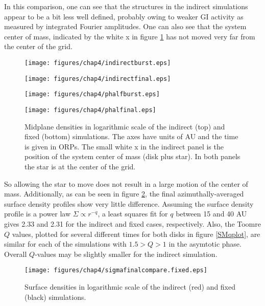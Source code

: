 In this comparison, one can see that the structures in the indirect simulations appear to be a bit less well defined, probably owing to weaker GI activity as measured by integrated Fourier amplitudes. One can also see that the system center of mass, indicated by the white x in figure \ref{SMfinalcomp} has not moved very far from the center of the grid. 
\begin{figure}[p]
\begin{minipage}{0.5\linewidth}
\centering
\texttt{[image: figures/chap4/indirectburst.eps]}
\end{minipage}
\hspace{0.25in}
\begin{minipage}{0.5\linewidth}
\centering
\texttt{[image: figures/chap4/indirectfinal.eps]}
\end{minipage}
\vspace{0.5in}


\begin{minipage}{0.5\linewidth}
\centering
\texttt{[image: figures/chap4/phalfburst.eps]}
\end{minipage}
\hspace{0.25in}
\begin{minipage}{0.5\linewidth}
\centering
\texttt{[image: figures/chap4/phalfinal.eps]}
\end{minipage}
\caption[Comparison of indirect and fixed run final midplane densities]{Midplane densities in logarithmic scale of the indirect (top) and fixed (bottom) simulations. The axes have units of AU and the time is given in ORPs. The small white x in the indirect panel is the position of the system center of mass (disk plus star). In both panels the star is at the center of the grid.}
\label{SMfinalcomp}
\end{figure}
So allowing the star to move does not result in a large motion of the center of mass. Additionally, as can be seen in figure \ref{SMsurfcomp}, the final azimuthally-averaged surface density profiles show very little difference. Assuming the surface density profile is a power law $\Sigma \propto r^{-q}$, a least squares fit for $q$ between 15 and 40 AU gives 2.33 and 2.31 for the indirect and fixed cases, respectively. Also, the Toomre $Q$ values, plotted for several different times for both disks in figure \ref{SMqplot}, are similar for each of the simulations with $1.5 > Q > 1$ in the asymtotic phase. Overall $Q$-values may be slightly smaller for the indirect simulation. 
\begin{figure}[p]
\centering
\texttt{[image: figures/chap4/sigmafinalcompare.fixed.eps]}
\caption[Comparison of indirect and fixed run final surface densities]{Surface densities in logarithmic scale of the indirect (red) and fixed (black) simulations. }
\label{SMsurfcomp}
\end{figure}

